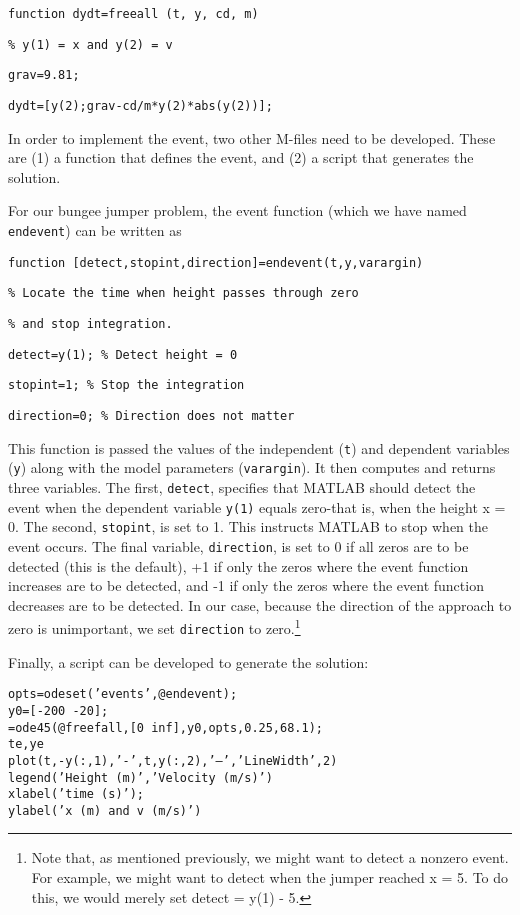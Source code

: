 \documentclass[../main.tex]{subfiles}
\begin{document}
\texttt{function dydt=freeall (t, y, cd, m)}

\texttt{\% y(1) = x and y(2) = v}

\texttt{grav=9.81;}

\texttt{dydt=[y(2);grav-cd/m*y(2)*abs(y(2))];}

\noindent In order to implement the event, two other M-files need to be developed. These are (1) a function that defines the event, and (2) a script that generates the solution.

For our bungee jumper problem, the event function (which we have named \texttt{endevent}) can be written as

\texttt{function [detect,stopint,direction]=endevent(t,y,varargin)}

\texttt{\% Locate the time when height passes through zero}

\texttt{\% and stop integration.}

\texttt{detect=y(1); \quad \% Detect height = 0}

\texttt{stopint=1; \quad \% Stop the integration}

\texttt{direction=0; \quad \% Direction does not matter}

\noindent This function is passed the values of the independent (\texttt{t}) and dependent variables (\texttt{y}) along
with the model parameters (\texttt{varargin}). It then computes and returns three variables.
The first, \texttt{detect}, specifies that MATLAB should detect the event when the dependent
variable \texttt{y(1)} equals zero-that is, when the height x = 0. The second, \texttt{stopint}, is set to 1.
This instructs MATLAB to stop when the event occurs. The final variable, \texttt{direction}, is set to 0 if all zeros are to be detected (this is the default), +1 if only the zeros where the
event function increases are to be detected, and -1 if only the zeros where the event function decreases are to be detected. In our case, because the direction of the approach to zero
is unimportant, we set \texttt{direction} to zero.\footnote[1]{Note that, as mentioned previously, we might want to detect a nonzero event. For example, we might want to
detect when the jumper reached x = 5. To do this, we would merely set detect = y(1) - 5.}

Finally, a script can be developed to generate the solution:

\texttt{opts=odeset('events',@endevent);\\
\indent y0=[-200 -20];\\
\indent [t,y,te,ye]=ode45(@freefall,[0 inf],y0,opts,0.25,68.1);\\
\indent te,ye\\
\indent plot(t,-y(:,1),'-',t,y(:,2),'--','LineWidth',2)\\
\indent legend('Height (m)','Velocity (m/s)')\\
\indent xlabel('time (s)');\\
\indent ylabel('x (m) and v (m/s)')}
\end{document}
